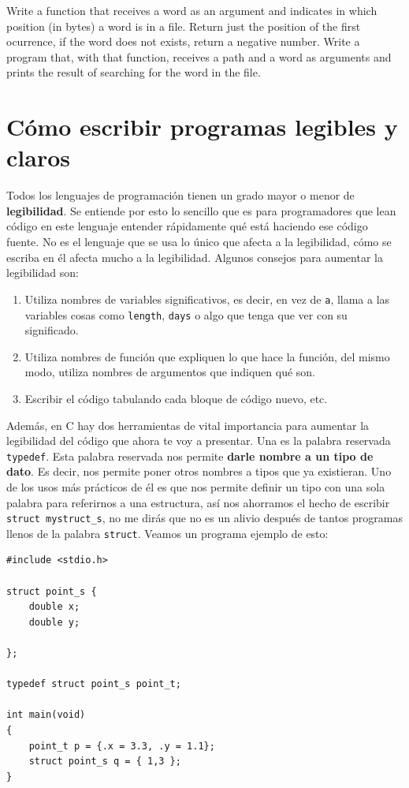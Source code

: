 \documentclass[a4paper]{article}
\begin{document}
\begin{exercises}[resume*]
\item Write a function that receives a word as an argument and indicates
in which position (in bytes) a word is in a file. Return just the position of
the first ocurrence, if the word does not exists, return a negative number.
Write a program that, with that function, receives a path and a word as
arguments and prints the result of searching for the word in the file.
\end{exercises}
\section{Cómo escribir programas legibles y claros}
Todos los lenguajes de programación tienen un grado mayor o menor de
\textbf{legibilidad}. Se entiende por esto lo sencillo que es para programadores
que lean código en este lenguaje entender rápidamente qué está haciendo ese
código fuente. No es el lenguaje que se usa lo único que afecta a la
legibilidad, cómo se escriba en él afecta mucho a la legibilidad. Algunos
consejos para aumentar la legibilidad son:
\begin{enumerate}
\item Utiliza nombres de variables significativos, es decir, en vez de \verb!a!,
llama a las variables cosas como \verb!length!, \verb!days! o algo que tenga
que ver con su significado.
\item Utiliza nombres de función que expliquen lo que hace la función, del mismo
modo, utiliza nombres de argumentos que indiquen qué son.
\item Escribir el código tabulando cada bloque de código nuevo, etc.
\end{enumerate}

Además, en C hay dos herramientas de vital importancia para aumentar la
legibilidad del código que ahora te voy a presentar. Una es la palabra
reservada \lstinline[style=C]!typedef!. Esta palabra reservada nos permite
\textbf{darle nombre a un tipo de dato}. Es decir, nos permite poner otros
nombres a tipos que ya existieran. Uno de los usos más prácticos de él es que
nos permite definir un tipo con una sola palabra para referirnos a una
estructura, así nos ahorramos el hecho de escribir \verb!struct mystruct_s!,
no me dirás que no es un alivio después de tantos programas llenos de la palabra
\verb!struct!. Veamos un programa ejemplo de esto:


\noindent
\begin{minipage}[H]{\linewidth}
\mbox{}
\begin{lstlisting}[style=C,
caption={Definición de un tipo a partir de una estructura},
label={lst:structTypeDefinition}]
#include <stdio.h>

struct point_s {
    double x;
    double y;

};

typedef struct point_s point_t;

int main(void)
{
    point_t p = {.x = 3.3, .y = 1.1};
    struct point_s q = { 1,3 };
}
\end{lstlisting}
\end{minipage}
\end{document}
